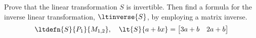Prove that the linear transformation $S$ is invertible.  Then find a formula for the inverse linear transformation, $\ltinverse{S}$, by employing a matrix inverse.
%
\begin{equation*}
\ltdefn{S}{P_1}{M_{1,2}},\quad \lt{S}{a+bx}=
\begin{bmatrix} 3a+b & 2a+b \end{bmatrix}
\end{equation*}
%